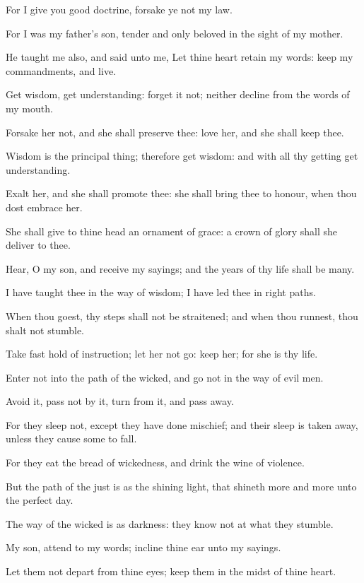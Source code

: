 \verse For I give you good doctrine, forsake ye not my law.

\verse For I was my father's son, tender and only beloved in the sight of my mother.

\verse He taught me also, and said unto me, Let thine heart retain my words: keep my commandments, and live.

\verse Get wisdom, get understanding: forget it not; neither decline from the words of my mouth.

\verse Forsake her not, and she shall preserve thee: love her, and she shall keep thee.

\verse Wisdom is the principal thing; therefore get wisdom: and with all thy getting get understanding.

\verse Exalt her, and she shall promote thee: she shall bring thee to honour, when thou dost embrace her.

\verse She shall give to thine head an ornament of grace: a crown of glory shall she deliver to thee.

\verse Hear, O my son, and receive my sayings; and the years of thy life shall be many.

\verse I have taught thee in the way of wisdom; I have led thee in right paths.

\verse When thou goest, thy steps shall not be straitened; and when thou runnest, thou shalt not stumble.

\verse Take fast hold of instruction; let her not go: keep her; for she is thy life.

\verse Enter not into the path of the wicked, and go not in the way of evil men.

\verse Avoid it, pass not by it, turn from it, and pass away.

\verse For they sleep not, except they have done mischief; and their sleep is taken away, unless they cause some to fall.

\verse For they eat the bread of wickedness, and drink the wine of violence.

\verse But the path of the just is as the shining light, that shineth more and more unto the perfect day.

\verse The way of the wicked is as darkness: they know not at what they stumble.

\verse My son, attend to my words; incline thine ear unto my sayings.

\verse Let them not depart from thine eyes; keep them in the midst of thine heart.

